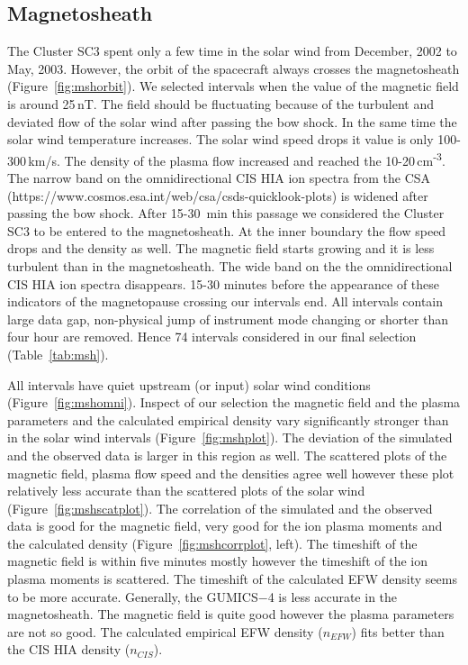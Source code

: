 \documentclass[linenumbers,draft]{agujournal}
\begin{document}
\subsection{Magnetosheath}
\label{sec:msh}

The Cluster SC3 spent only a few time in the solar wind from December, 2002 to May, 2003. However, the orbit of the spacecraft always crosses the magnetosheath (Figure~\ref{fig:mshorbit}). We selected intervals when the value of the magnetic field is around 25\,nT. The field should be fluctuating because of the turbulent and deviated flow of the solar wind after passing the bow shock. In the same time the solar wind temperature increases. The solar wind speed drops it value is only 100-300\,km/s. The density of the plasma flow increased and reached the 10-20\,cm\textsuperscript{-3}.  The narrow band on the  omnidirectional CIS HIA ion spectra from the CSA (https://www.cosmos.esa.int/web/csa/csds-quicklook-plots) is widened after passing the bow shock. After 15-30 \,min this passage we considered the Cluster SC3 to be entered to the magnetosheath. At the inner boundary the flow speed drops and the density as well. The magnetic field starts growing and it is less turbulent than in the magnetosheath. The wide band on the  the omnidirectional CIS HIA ion spectra disappears. 15-30 minutes before the appearance  of these indicators of the magnetopause crossing our intervals end. All intervals contain large data gap, non-physical jump of instrument mode changing or shorter than four hour are removed. Hence 74 intervals considered in our final selection (Table~\ref{tab:msh}). 

All intervals have quiet upstream (or input) solar wind conditions (Figure~\ref{fig:mshomni}). Inspect of our selection the magnetic field and the plasma parameters and the calculated empirical density vary significantly stronger than in the solar wind intervals (Figure~\ref{fig:mshplot}). The deviation of the simulated and the observed data is larger in this region as well. The scattered plots of the magnetic field, plasma flow speed and the densities agree well however these plot relatively less accurate than the scattered plots of the solar wind (Figure~\ref{fig:mshscatplot}). The correlation of the simulated and the observed data is good for the magnetic field, very good for the ion plasma moments and the calculated density (Figure~\ref{fig:mshcorrplot}, left). The timeshift of the magnetic field is within five minutes mostly however the timeshift of the ion plasma moments is scattered. The timeshift of the calculated EFW density seems to be more accurate. Generally, the GUMICS$-$4 is less accurate in the magnetosheath. The magnetic field is quite good however the plasma parameters are not so good. The calculated empirical EFW density ($n_{EFW}$) fits better than the CIS HIA density ($n_{CIS}$).
\end{document}
